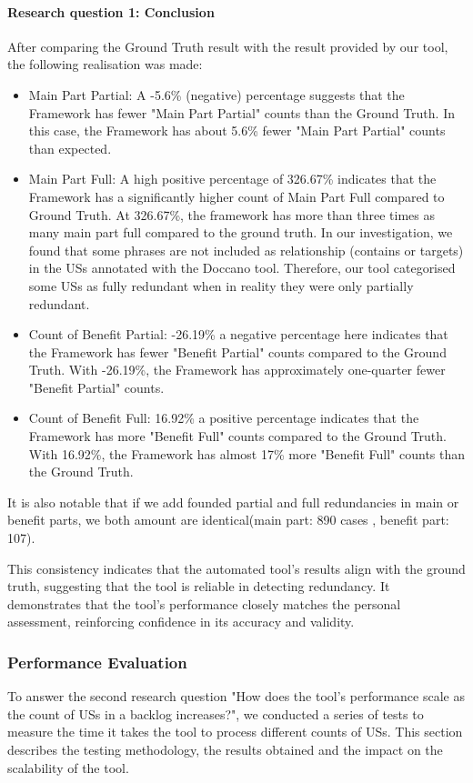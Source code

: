 \paragraph{Research question 1: Conclusion}
After comparing the Ground Truth result with the result provided by our tool, the following realisation was made:
\begin{itemize}
	\item Main Part Partial: A -5.6\% (negative) percentage suggests that the Framework has fewer "Main Part Partial" counts than the Ground Truth.
	In this case, the Framework has about 5.6\% fewer "Main Part Partial" counts than expected.
	
	\item Main Part Full: A high positive percentage of 326.67\% indicates that the Framework has a significantly higher count of Main Part Full compared to Ground Truth.
	At 326.67\%, the framework has more than three times as many main part full compared to the ground truth.
	In our investigation, we found that some phrases are not included as relationship (contains or targets) in the USs annotated with the Doccano tool. Therefore, our tool categorised some USs as fully redundant when in reality they were only partially redundant.
	
	\item Count of Benefit Partial: -26.19\% a negative percentage here indicates that the Framework has fewer "Benefit Partial" counts compared to the Ground Truth.
	With -26.19\%, the Framework has approximately one-quarter fewer "Benefit Partial" counts.
	
	\item Count of Benefit Full: 16.92\% a positive percentage indicates that the Framework has more "Benefit Full" counts compared to the Ground Truth.
	With 16.92\%, the Framework has almost 17\% more "Benefit Full" counts than the Ground Truth.
\end{itemize}
It is also notable that if we add founded partial and full redundancies in main or benefit parts, we both amount are identical(main part: 890 cases , benefit part: 107).

This consistency indicates that the automated tool's results align with the ground truth, suggesting that the tool is reliable in detecting redundancy. It demonstrates that the tool's performance closely matches the personal assessment, reinforcing confidence in its accuracy and validity.
\subsubsection*{Performance Evaluation}
To answer the second research question "How does the tool's performance scale as the count of USs in a backlog increases?", we conducted a series of tests to measure the time it takes the tool to process different counts of USs. This section describes the testing methodology, the results obtained and the impact on the scalability of the tool.
